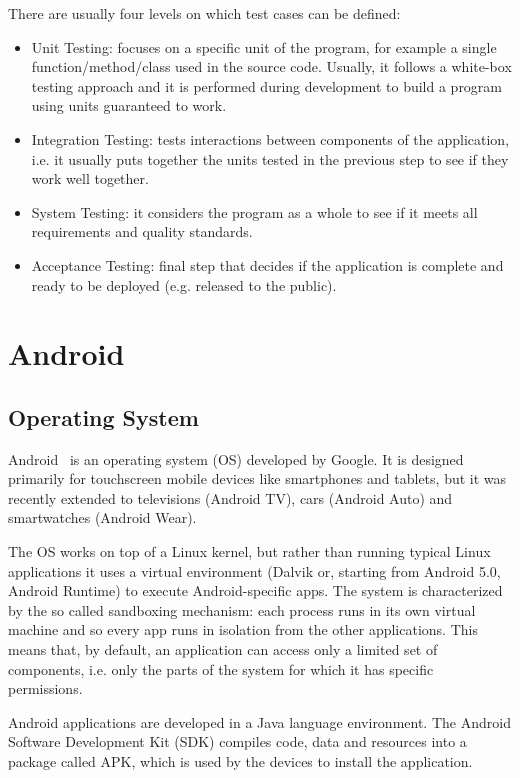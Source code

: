 \documentclass[11pt,a4paper,notitlepage]{article}
\begin{document}
There are usually four levels on which test cases can be defined:
\begin{itemize}
	\item Unit Testing: focuses on a specific unit of the program, for example a single function/method/class used in the source code. Usually, it follows a white-box testing approach and it is performed during development to build a program using units guaranteed to work.
	\item Integration Testing: tests interactions between components of the application, i.e. it usually puts together the units tested in the previous step to see if they work well together.
	\item System Testing: it considers the program as a whole to see if it meets all requirements and quality standards.
	\item Acceptance Testing: final step that decides if the application is complete and ready to be deployed (e.g. released to the public).
\end{itemize}

\section{Android}

\subsection{Operating System}
Android~\cite{Android} is an operating system (OS) developed by Google. It is designed primarily for touchscreen mobile devices like smartphones and tablets, but it was recently extended to televisions (Android TV), cars (Android Auto) and smartwatches (Android Wear).

The OS works on top of a Linux kernel, but rather than running typical Linux applications it uses a virtual environment (Dalvik or, starting from Android 5.0, Android Runtime) to execute Android-specific apps. The system is characterized by the so called sandboxing mechanism: each process runs in its own virtual machine and so every app runs in isolation from the other applications. This means that, by default, an application can access only a limited set of components, i.e. only the parts of the system for which it has specific permissions.

Android applications are developed in a Java language environment. The Android Software Development Kit (SDK) compiles code, data and resources into a package called APK, which is used by the devices to install the application.
\end{document}
